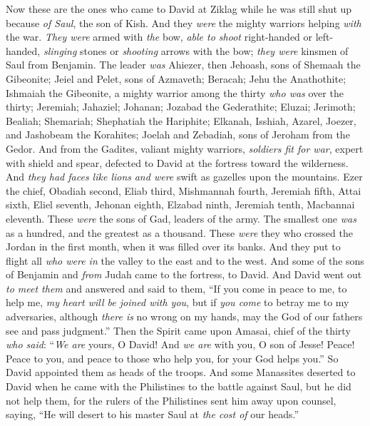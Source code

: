 \begin{biblechapter} %
 Now these are the ones who came to David at Ziklag while he was still shut up because \textit{of Saul}, the son of Kish. And they \textit{were} the mighty warriors helping \textit{with} the war.
\verse \textit{They were} armed with \textit{the} bow, \textit{able to shoot} right-handed or left-handed, \textit{slinging} stones or \textit{shooting} arrows with the bow; \textit{they were} kinsmen of Saul from Benjamin.
\verse The leader \textit{was} Ahiezer, then Jehoash, sons of Shemaah the Gibeonite; Jeiel and Pelet, sons of Azmaveth; Beracah; Jehu the Anathothite;
\verse Ishmaiah the Gibeonite, a mighty warrior among the thirty \textit{who was} over the thirty; Jeremiah; Jahaziel; Johanan; Jozabad the Gederathite;
\verse  Eluzai; Jerimoth; Bealiah; Shemariah; Shephatiah the Hariphite;
\verse Elkanah, Isshiah, Azarel, Joezer, and Jashobeam the Korahites;
\verse Joelah and Zebadiah, sons of Jeroham from the Gedor.
\verse And from the Gadites, valiant mighty warriors, \textit{soldiers fit for war}, expert with shield and spear, defected to David at the fortress toward the wilderness. And \textit{they had faces like lions} \textit{and were} swift as gazelles upon the mountains.
\verse Ezer the chief, Obadiah second, Eliab third,
\verse Mishmannah fourth, Jeremiah fifth,
\verse Attai sixth, Eliel seventh,
\verse Jehonan eighth, Elzabad ninth,
\verse Jeremiah tenth, Macbannai eleventh.
\verse These \textit{were} the sons of Gad, leaders of the army. The smallest one \textit{was} as a hundred, and the greatest as a thousand.
\verse These \textit{were} they who crossed the Jordan in the first month, when it was filled over its banks. And they put to flight all \textit{who were in} the valley to the east and to the west.
\verse And some of the sons of Benjamin and \textit{from} Judah came to the fortress, to David.
\verse And David went out \textit{to meet them} and answered and said to them, “If you come in peace to me, to help me, \textit{my heart will be joined with you}, but if \textit{you come} to betray me to my adversaries, although \textit{there is} no wrong on my hands, may the God of our fathers see and pass judgment.”
\verse Then the Spirit came upon Amasai, chief of the thirty \textit{who said}: “\textit{We are} yours, O David! 
And \textit{we are} with you, O son of Jesse! 
Peace! Peace to you, and peace to those who help you, 
for your God helps you.” So David appointed them as heads of the troops.
\verse And some Manassites deserted to David when he came with the Philistines to the battle against Saul, but he did not help them, for the rulers of the Philistines sent him away upon counsel, saying, “He will desert to his master Saul at \textit{the cost of} our heads.”

\end{biblechapter}
